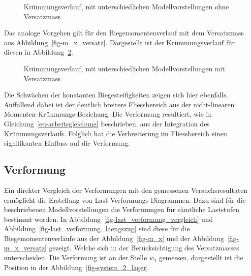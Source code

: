 \documentclass[
  12pt,
  letterpaper,
  egregdoesnotlikesansseriftitles]{scrreprt}
\begin{document}
\begin{figure}[H]


\caption{\label{fig-chi_x_diagramm_vergleich}Krümmungsverlauf, mit
unterschiedlichen Modellvorstellungen ohne Versatzmass}

\end{figure}%

Das analoge Vorgehen gilt für den Biegemomentenverlauf mit dem
Versatzmass aus Abbildung~\ref{fig-m_x_versatz}. Dargestellt ist der
Krümmungsverlauf für diesen in
Abbildung~\ref{fig-chi_x_diagramm_laengszugkraft}.

\begin{figure}[H]


\caption{\label{fig-chi_x_diagramm_laengszugkraft}Krümmungsverlauf, mit
unterschiedlichen Modellvorstellungen mit Versatzmass}

\end{figure}%

Die Schwächen der konstanten Biegesteifigkeiten zeigen sich hier
ebenfalls. Auffallend dabei ist der deutlich breitere Fliessbereich aus
der nicht-linearen Momenten-Krümmungs-Beziehung. Die Verformung
resultiert, wie in Gleichung~\ref{eq-arbeitsgleichung} beschrieben, aus
der Integration des Krümmungsverlaufs. Folglich hat die Verbreiterung im
Fliessbereich einen signifikanten Einfluss auf die Verformung.

\subsection{Verformung}\label{verformung}

Ein direkter Vergleich der Verformungen mit den gemessenen
Versuchsresultaten ermöglicht die Erstellung von
Last-Verformungs-Diagrammen. Dazu sind für die beschriebenen
Modellvorstellungen die Verformungen für sämtliche Laststufen bestimmt
worden. In Abbildung~\ref{fig-last_verformung_vergleich} und
Abbildung~\ref{fig-last_verformung_laengszug} sind diese für die
Biegemomentenverläufe aus der Abbildung~\ref{fig-m_x} und der
Abbildung~\ref{fig-m_x_versatz} gezeigt. Welche sich in der
Berücksichtigung des Versatzmasses unterscheiden. Die Verformung ist an
der Stelle \(w_1\) gemessen, dargestellt ist die Position in der
Abbildung~\ref{fig-system_2_lager}.
\end{document}
